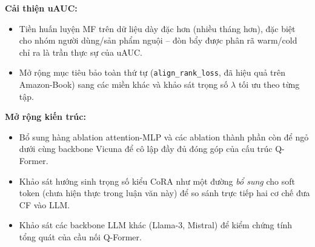 \textbf{Cải thiện uAUC:}
\begin{itemize}
    \item Tiền huấn luyện MF trên dữ liệu dày đặc hơn (nhiều tháng hơn), đặc biệt cho
    nhóm người dùng/sản phẩm nguội -- đòn bẩy được phân rã warm/cold chỉ ra là trần thực sự
    của uAUC.
    \item Mở rộng mục tiêu bảo toàn thứ tự (\texttt{align\_rank\_loss}, đã hiệu quả trên
    Amazon-Book) sang các miền khác và khảo sát trọng số $\lambda$ tối ưu theo từng tập.
\end{itemize}

\textbf{Mở rộng kiến trúc:}
\begin{itemize}
    \item Bổ sung hàng ablation attention-MLP và các ablation thành phần còn để ngỏ dưới
    cùng backbone Vicuna để cô lập đầy đủ đóng góp của cấu trúc Q-Former.
    \item Khảo sát hướng sinh trọng số kiểu CoRA như một đường \textit{bổ sung} cho soft
    token (chưa hiện thực trong luận văn này) để so sánh trực tiếp hai cơ chế đưa CF vào LLM.
    \item Khảo sát các backbone LLM khác (Llama-3, Mistral) để kiểm chứng tính tổng
    quát của cầu nối Q-Former.
\end{itemize}

